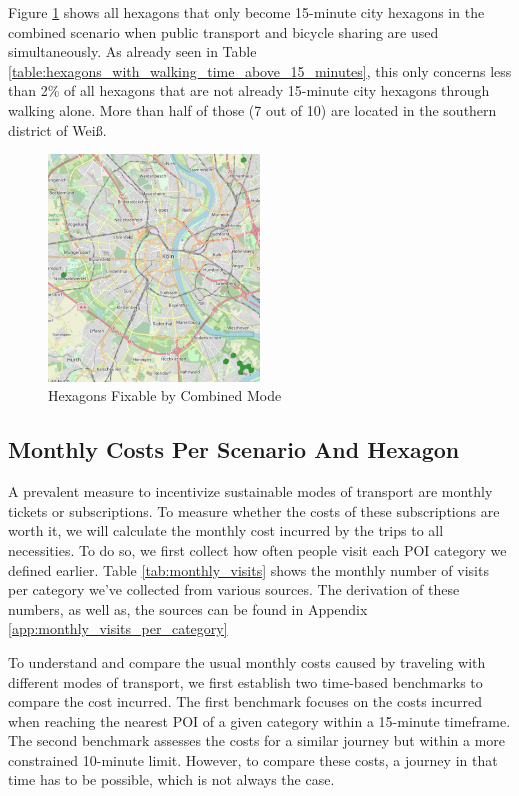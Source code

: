 Figure \ref{fig:combined_hexagons} shows all hexagons that only become 15-minute city hexagons in the combined scenario when public transport and bicycle sharing are used simultaneously.
As already seen in Table \ref{table:hexagons_with_walking_time_above_15_minutes}, this only concerns less than 2\% of all hexagons that are not already 15-minute city hexagons through walking alone.
More than half of those (7 out of 10) are located in the southern district of Weiß.
\begin{figure}
  \begin{center}
    \includegraphics[width=0.50\textwidth]{Figures/results/problematic_hexagons/combined_hexagons}
  \end{center}
  \caption{Hexagons Fixable by Combined Mode}
  \label{fig:combined_hexagons}
\end{figure}


\subsection{Monthly Costs Per Scenario And Hexagon}
\label{sec:monthly_costs}
A prevalent measure to incentivize sustainable modes of transport are monthly tickets or subscriptions.
To measure whether the costs of these subscriptions are worth it, we will calculate the monthly cost incurred by the trips to all necessities.
To do so, we first collect how often people visit each POI category we defined earlier.
Table \ref{tab:monthly_visits} shows the monthly number of visits per category we've collected from various sources.
The derivation of these numbers, as well as, the sources can be found in Appendix \ref{app:monthly_visits_per_category}

To understand and compare the usual monthly costs caused by traveling with different modes of transport, we first establish two time-based benchmarks to compare the cost incurred.
The first benchmark focuses on the costs incurred when reaching the nearest POI of a given category within a 15-minute timeframe. 
The second benchmark assesses the costs for a similar journey but within a more constrained 10-minute limit.
However, to compare these costs, a journey in that time has to be possible, which is not always the case.

